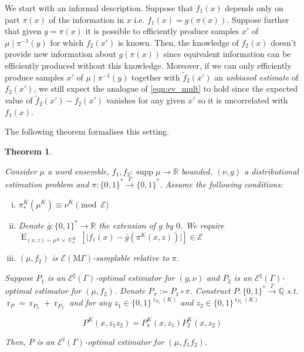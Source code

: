 \documentclass{article}
\numberwithin{equation}{section}
\theoremstyle{definition}
\theoremstyle{plain}
\newtheorem{theorem}{Theorem}[section]
\newcommand{\Bool}{\{0,1\}}
\newcommand{\Words}{{\Bool^*}}
\newcommand{\WordsLen}[1]{{\Bool^{#1}}}
\DeclareMathOperator{\Supp}{supp}
\DeclareMathOperator{\E}{E}
\DeclareMathOperator{\R}{r}
\DeclareMathOperator{\Un}{U}
\newcommand{\Rats}{\mathbb{Q}}
\newcommand{\Reals}{\mathbb{R}}
\newcommand{\Abs}[1]{\lvert #1 \rvert}
\newcommand{\MGrow}{\mathrm{M}\Gamma}
\newcommand{\Fall}{\mathcal{E}}
\newcommand{\ESG}{\Fall^\sharp(\Gamma)}
\newcommand{\EMG}{\Fall(\MGrow)}
\newcommand{\Scheme}{\xrightarrow{\Gamma}}
\begin{document}
We start with an informal description. Suppose that $f_1(x)$ depends only on part $\pi(x)$ of the information in $x$ i.e. $f_1(x) = g(\pi(x))$. Suppose further that given $y=\pi(x)$ it is possible to efficiently produce samples $x'$ of $\mu \mid \pi^{-1}(y)$ for which $f_2(x')$ is known. Then, the knowledge of $f_2(x)$ doesn't provide new information about $g(\pi(x))$ since equivalent information can be efficiently produced without this knowledge.
 Moreover, if we can only efficiently produce samples $x'$ of $\mu \mid \pi^{-1}(y)$ together with $\tilde{f}_2(x')$ an \emph{unbiased estimate} of $f_2(x')$, we still expect the analogue of \ref{eqn:ev_mult} to hold since the expected value of $\tilde{f}_2(x') - f_2(x')$ vanishes for any given $x'$ so it is uncorrelated with $f_1(x)$.
 
The following theorem formalises this setting.

\begin{samepage}
\begin{theorem}
\label{thm:mult}

Consider $\mu$ a word ensemble, $f_1, f_2: \Supp \mu \rightarrow \Reals$ bounded, $(\nu,g)$ a distributional estimation problem and $\pi: \Words \Scheme \Words$. Assume the following conditions:

\begin{enumerate}[(i)]

\item\label{con:thm__mult__dist} $\pi_*^{K}(\mu^{K}) \equiv \nu^{K} \pmod \Fall$

\item\label{con:thm__mult__fun} Denote ${\bar{g}: \Words \rightarrow \Reals}$ the extension of $g$ by $0$.  We require ${\E_{(x,z) \sim \mu^{K} \times \Un_\pi^{K}}[\Abs{f_1(x)-\bar{g}(\pi^{K}(x,z))}] \in \Fall}$

\item\label{con:thm__mult__smp} $(\mu, f_2)$ is $\EMG$-samplable relative to $\pi$.

\end{enumerate}

Suppose $P_1$ is an $\ESG$-optimal estimator for $(g,\nu)$ and $P_2$ is an $\ESG$-optimal estimator for $(\mu,f_2)$. Denote $P_\pi := P_1 \circ \pi$. Construct ${P: \Words \Scheme \Rats}$ s.t. $\R_P=\R_{P_\pi}+\R_{P_2}$ and for any $z_1 \in \WordsLen{\R_{P_\pi}(K)}$ and $z_2 \in \WordsLen{\R_{P_2}(K)}$

\begin{equation}
P^{K}(x,z_1 z_2)=P_\pi^{K}(x,z_1) P_2^{K}(x,z_2)
\end{equation}

Then, $P$ is an $\ESG$-optimal estimator for $(\mu,f_1 f_2)$.

\end{theorem}
\end{samepage}
\end{document}
